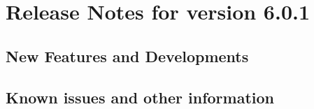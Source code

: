 \section{Release Notes for version 6.0.1}

\subsection{New Features and Developments}


\subsection{Known issues and other information}

